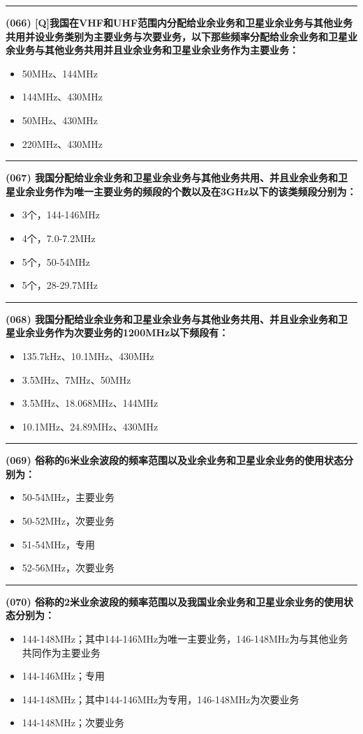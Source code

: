 \documentclass[twocolumn]{ctexart}  %
\begin{document}
\noindent\rule{0.5\textwidth}{1pt}
\heiti \textbf{(066) [Q]我国在VHF和UHF范围内分配给业余业务和卫星业余业务与其他业务共用并设业务类别为主要业务与次要业务，以下那些频率分配给业余业务和卫星业余业务与其他业务共用并且业余业务和卫星业余业务作为主要业务： } \songti {\color{gray} [LK0146] }
\begin{itemize}
	\item  50MHz、144MHz
	\item  144MHz、430MHz
	\item  50MHz、430MHz
	\item  220MHz、430MHz
\end{itemize}


\noindent\rule{0.5\textwidth}{1pt}
\heiti \textbf{(067) 我国分配给业余业务和卫星业余业务与其他业务共用、并且业余业务和卫星业余业务作为唯一主要业务的频段的个数以及在3GHz以下的该类频段分别为：} \songti {\color{gray} [LK0147] }
\begin{itemize}
	\item  3个，144-146MHz
	\item  4个，7.0-7.2MHz
	\item  5个，50-54MHz
	\item  5个，28-29.7MHz
\end{itemize}


\noindent\rule{0.5\textwidth}{1pt}
\heiti \textbf{(068) 我国分配给业余业务和卫星业余业务与其他业务共用、并且业余业务和卫星业余业务作为次要业务的1200MHz以下频段有：} \songti {\color{gray} [LK0148] }
\begin{itemize}
	\item  135.7kHz、10.1MHz、430MHz
	\item  3.5MHz、7MHz、50MHz
	\item  3.5MHz、18.068MHz、144MHz
	\item  10.1MHz、24.89MHz、430MHz
\end{itemize}


\noindent\rule{0.5\textwidth}{1pt}
\heiti \textbf{(069) 俗称的6米业余波段的频率范围以及业余业务和卫星业余业务的使用状态分别为：} \songti {\color{gray} [LK0157] }
\begin{itemize}
	\item  50-54MHz，主要业务
	\item  50-52MHz，次要业务
	\item  51-54MHz，专用
	\item  52-56MHz，次要业务
\end{itemize}


\noindent\rule{0.5\textwidth}{1pt}
\heiti \textbf{(070) 俗称的2米业余波段的频率范围以及我国业余业务和卫星业余业务的使用状态分别为：} \songti {\color{gray} [LK0158] }
\begin{itemize}
	\item  144-148MHz；其中144-146MHz为唯一主要业务，146-148MHz为与其他业务共同作为主要业务
	\item  144-146MHz；专用
	\item  144-148MHz；其中144-146MHz为专用，146-148MHz为次要业务
	\item  144-148MHz；次要业务
\end{itemize}
\end{document}
